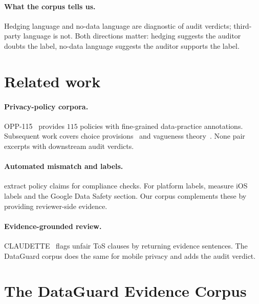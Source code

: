 \documentclass[11pt,a4paper]{article}
\begin{document}
\paragraph{What the corpus tells us.}
Hedging language and no-data language are diagnostic of audit verdicts;
third-party language is not. Both directions matter: hedging suggests
the auditor doubts the label, no-data language suggests the auditor
supports the label.

\section{Related work}
\paragraph{Privacy-policy corpora.}
OPP-115~\citep{wilson2016creation} provides $115$ policies with
fine-grained data-practice annotations. Subsequent work covers choice
provisions~\citep{sathyendra2017identifying} and vagueness
theory~\citep{bhatia2016theory}. None pair excerpts with downstream
audit verdicts.

\paragraph{Automated mismatch and labels.}
\citet{harkous2018polisis,andow2019policylint,andow2020policheck,zimmeck2019maps}
extract policy claims for compliance checks. For platform labels,
\citet{xiao2023lalaine} measure iOS labels and
\citet{khandelwal2024unpacking} the Google Data Safety section. Our
corpus complements these by providing reviewer-side evidence.

\paragraph{Evidence-grounded review.}
CLAUDETTE~\citep{lippi2019claudette} flags unfair ToS clauses by
returning evidence sentences. The DataGuard corpus does the same for
mobile privacy and adds the audit verdict.

\section{The DataGuard Evidence Corpus}
\end{document}
